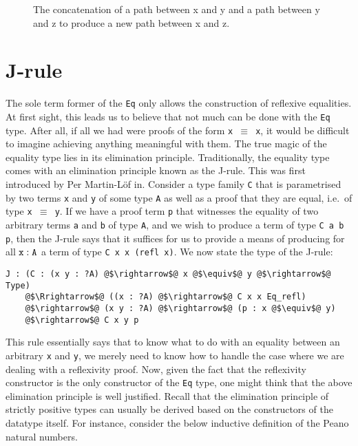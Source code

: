 \documentclass[12pt,twoside,maitrise]{dms}
\theoremstyle{definition}
\numberwithin{equation}{section}
\numberwithin{table}{chapter}
\numberwithin{figure}{chapter}
\newcommand\id[1] {\texttt{#1}}
\newcommand\fn[1] {\texttt{#1}}
\begin{document}
\begin{figure}[H]

\caption{The concatenation of a path between x and y and a path between y and z to produce a new path between x and z.}
\end{figure}


\section{J-rule}\label{subsec:j-rule}
The sole term former of the \id{Eq} only allows the construction of reflexive
equalities. At first sight, this leads us to believe that not much can be done
with the \id{Eq} type. After all, if all we had were proofs of the form \fn{x
  $\equiv$ x}, it would be difficult to imagine achieving anything meaningful
with them. The true magic of the equality type lies in its elimination
principle. Traditionally, the equality type comes with an elimination principle
known as the J-rule. This was first introduced by Per Martin-Löf
in\cite{martin1975intuitionistic}. Consider a type family \id{C} that is
parametrised by two terms \id{x} and \id{y} of some type \id{A} as well as a
proof that they are equal, i.e.\ of type \fn{x $\equiv$ y}. If we have a proof
term \id{p} that witnesses the equality of two arbitrary terms \id{a} and \id{b}
of type \id{A}, and we wish to produce a term of type \fn{C a b p}, then the
J-rule says that it suffices for us to provide a means of producing for all
$\oftype{\id{x}}{\id{A}}$ a term of type \fn{C x x (refl x)}. We now state the
type of the J-rule:

\begin{verbatim}
J : (C : (x y : ?A) @$\rightarrow$@ x @$\equiv$@ y @$\rightarrow$@ Type)
    @$\Rrightarrow$@ ((x : ?A) @$\rightarrow$@ C x x Eq_refl)
    @$\rightarrow$@ (x y : ?A) @$\rightarrow$@ (p : x @$\equiv$@ y)
    @$\rightarrow$@ C x y p
\end{verbatim}

This rule essentially says that to know what to do with an equality between an
arbitrary \id{x} and \id{y}, we merely need to know how to handle the case where
we are dealing with a reflexivity proof. Now, given the fact that the
reflexivity constructor is the only constructor of the \id{Eq} type, one might
think that the above elimination principle is well justified. Recall that the
elimination principle of strictly positive types\cite{abbott2005containers} can
usually be derived based on the constructors of the datatype itself. For
instance, consider the below inductive definition of the Peano natural numbers.
\end{document}
